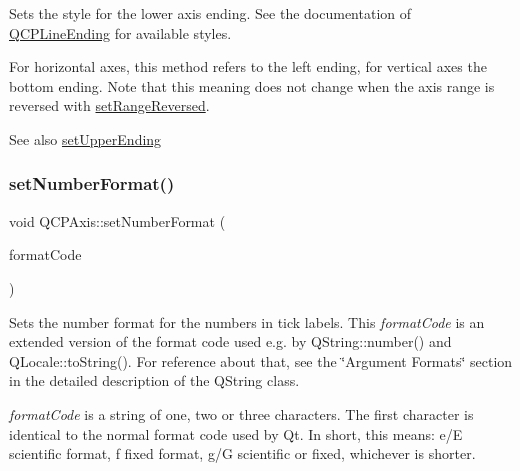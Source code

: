 Sets the style for the lower axis ending. See the documentation of \hyperlink{class_q_c_p_line_ending}{Q\+C\+P\+Line\+Ending} for available styles.

For horizontal axes, this method refers to the left ending, for vertical axes the bottom ending. Note that this meaning does not change when the axis range is reversed with \hyperlink{class_q_c_p_axis_a2172fdb196b1a0dc3f40992fcad8e9e1}{set\+Range\+Reversed}.

\begin{DoxySeeAlso}{See also}
\hyperlink{class_q_c_p_axis_a69119b892fc306f651763596685aa377}{set\+Upper\+Ending} 
\end{DoxySeeAlso}
\mbox{\label{class_q_c_p_axis_ae585a54dc2aac662e90a2ca82f002590}} 
\subsubsection{\texorpdfstring{set\+Number\+Format()}{setNumberFormat()}}
{\footnotesize\ttfamily void Q\+C\+P\+Axis\+::set\+Number\+Format (\begin{DoxyParamCaption}\item[{const Q\+String \&}]{format\+Code }\end{DoxyParamCaption})}

Sets the number format for the numbers in tick labels. This {\itshape format\+Code} is an extended version of the format code used e.\+g. by Q\+String\+::number() and Q\+Locale\+::to\+String(). For reference about that, see the \char`\"{}\+Argument Formats\char`\"{} section in the detailed description of the Q\+String class.

{\itshape format\+Code} is a string of one, two or three characters. The first character is identical to the normal format code used by Qt. In short, this means\+: \textquotesingle{}e\textquotesingle{}/\textquotesingle{}E\textquotesingle{} scientific format, \textquotesingle{}f\textquotesingle{} fixed format, \textquotesingle{}g\textquotesingle{}/\textquotesingle{}G\textquotesingle{} scientific or fixed, whichever is shorter.

